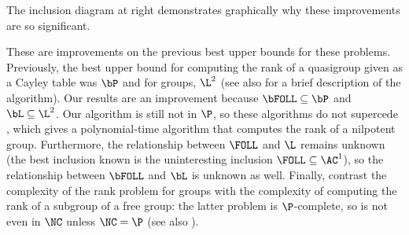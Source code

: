 The inclusion diagram at right demonstrates graphically why these improvements are so significant.

These are improvements on the previous best upper bounds for these problems.
Previously, the best upper bound for computing the rank of a quasigroup given as a Cayley table was $\bP$ \autocite[Section~5]{py96} and for groups, $\L^2$ \autocite{lsz77} (see also \cite[Proposition~6]{at06} for a brief description of the algorithm).
Our results are an improvement because $\bFOLL \subseteq \bP$ and $\bL \subseteq \L^2$.
Our algorithm is still not in $\P$, so these algorithms do not supercede \cite[Theorem~7]{at06}, which gives a polynomial-time algorithm that computes the rank of a nilpotent group.
Furthermore, the relationship between $\FOLL$ and $\L$ remains unknown (the best inclusion known is the uninteresting inclusion $\FOLL \subseteq \AC^1$), so the relationship between $\bFOLL$ and $\bL$ is unknown as well.
Finally, contrast the complexity of the rank problem for groups with the complexity of computing the rank of a subgroup of a free group: the latter problem is $\P$-complete, so is not even in $\NC$ unless $\NC = \P$ \autocite[Theorem~4.9]{am84} (see also \autocite[Problem~A.8.11]{ghr95}).

